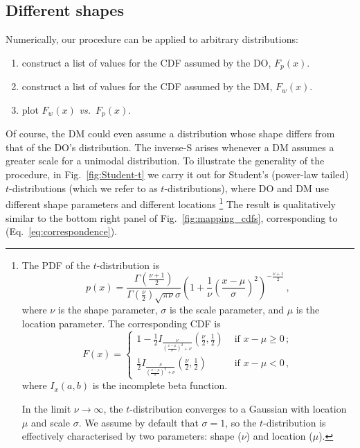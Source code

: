 \documentclass[a4paper, 12pt]{article}
\newcommand{\eref}[1]{(Eq.~\ref{eq:#1})}
\newcommand{\fref}[1]{Fig.~\ref{fig:#1}}
\newcommand{\seclabel}[1]{\label{sec:#1}}
\newcommand{\vs}{{\it vs.}\ }
\newcommand{\be}{\begin{equation}}
\newcommand{\ee}{\end{equation}}
\begin{document}
\subsection{Different shapes\seclabel{Different_shapes}}
Numerically, our procedure can be applied to arbitrary distributions: 
\begin{enumerate}
\item
construct a list of values for the CDF assumed by the DO, $F_p(x)$.
\item
construct a list of values for the CDF assumed by the DM, $F_w(x)$.
\item
plot $F_w(x)$ \vs $F_p(x)$.
\end{enumerate}
Of course, the DM could even assume a distribution whose shape differs from that of the DO's distribution. 
The inverse-S arises whenever a DM assumes a greater scale for a unimodal distribution. 
To illustrate the generality of the procedure, in \fref{Student-t} we carry it out for Student's (power-law tailed) $t$-distributions (which we refer to as $t$-distributions), where DO and DM use different shape parameters and different locations
\footnote{
The PDF of the $t$-distribution is
%
\be
p\left(x\right) = \frac{\Gamma\left(\frac{\nu+1}{2}\right)} {\Gamma\left(\frac{\nu}{2}\right)\sqrt{\pi\nu}\sigma} \left(1+\frac{1}{\nu}\left(\frac{x-\mu}{\sigma}\right)^2 \right)^{-\frac{\nu+1}{2}}\,,
\ee
%
where $\nu$ is the shape parameter, $\sigma$ is the scale parameter, and $\mu$ is the location parameter. The corresponding CDF is
%
\be
F\left(x\right) = 
\begin{cases}
1 - \frac{1}{2} I_{\frac{\nu}{\left(\frac{x-\mu}{\sigma}\right)^2 + \nu}}\left(\frac{\nu}{2},\frac{1}{2}\right) &\text{ if } x-\mu \geq 0\,;\\
\frac{1}{2} I_{\frac{\nu}{\left(\frac{x-\mu}{\sigma}\right)^2 + \nu}}\left(\frac{\nu}{2},\frac{1}{2}\right) &\text{ if } x-\mu < 0\,,
\end{cases}
\ee
%
where $I_x\left(a,b\right)$ is the incomplete beta function.

In the limit $\nu \rightarrow \infty$, the $t$-distribution converges to a Gaussian with location $\mu$ and scale $\sigma$. We assume by default that $\sigma = 1$, so the $t$-distribution is effectively characterised by two parameters: shape ($\nu$) and location ($\mu$).
}
The result is qualitatively similar to the bottom right panel of \fref{mapping_cdfs}, corresponding to \eref{correspondence}. 
\end{document}
